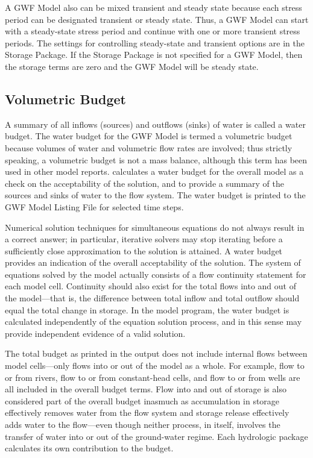 A GWF Model also can be mixed transient and steady state because each stress period can be designated transient or steady state.  Thus, a GWF Model can start with a steady-state stress period and continue with one or more transient stress periods.  The settings for controlling steady-state and transient options are in the Storage Package.  If the Storage Package is not specified for a GWF Model, then the storage terms are zero and the GWF Model will be steady state.

\subsection{Volumetric Budget}
A summary of all inflows (sources) and outflows (sinks) of water is called a water budget.  The water budget for the GWF Model is termed a volumetric budget because volumes of water and volumetric flow rates are involved; thus strictly speaking, a volumetric budget is not a mass balance, although this term has been used in other model reports.  \mf calculates a water budget for the overall model as a check on the acceptability of the solution, and to provide a summary of the sources and sinks of water to the flow system.  The water budget is printed to the GWF Model Listing File for selected time steps.

Numerical solution techniques for simultaneous equations do not always result in a correct answer; in particular, iterative solvers may stop iterating before a sufficiently close approximation to the solution is attained.  A water budget provides an indication of the overall acceptability of the solution.  The system of equations solved by the model actually consists of a flow continuity statement for each model cell.  Continuity should also exist for the total flows into and out of the model---that is, the difference between total inflow and total outflow should equal the total change in storage.  In the model program, the water budget is calculated independently of the equation solution process, and in this sense may provide independent evidence of a valid solution.

The total budget as printed in the output does not include internal flows between model cells---only flows into or out of the model as a whole. For example, flow to or from rivers, flow to or from constant-head cells, and flow to or from wells are all included in the overall budget terms.  Flow into and out of storage is also considered part of the overall budget inasmuch as accumulation in storage effectively removes water from the flow system and storage release effectively adds water to the flow---even though neither process, in itself, involves the transfer of water into or out of the ground-water regime.  Each hydrologic package calculates its own contribution to the budget.

